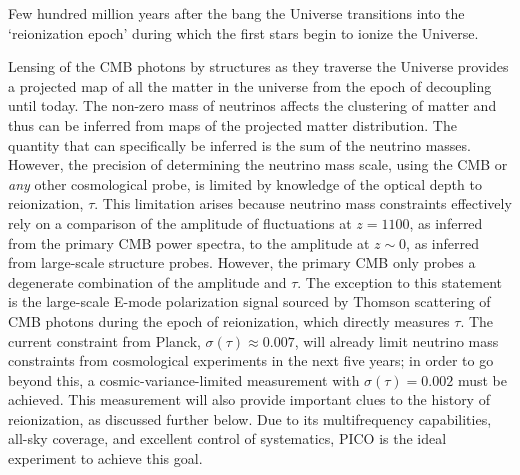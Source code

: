 \documentclass[PICOReport.tex]{subfiles}
\begin{document}
Few hundred million years after the bang the Universe transitions into the `reionization epoch' during which the 
first stars begin to ionize the Universe. 


Lensing of the CMB photons by structures as they traverse the Universe provides a projected map of all the matter 
in the universe from the epoch of decoupling until today.  The non-zero mass of neutrinos affects the clustering of 
matter and thus can be inferred from maps of the projected matter distribution. The quantity that can specifically be 
inferred is the sum of the neutrino masses.  
However, the precision of determining 
the neutrino mass scale, using the CMB or {\it any} other cosmological probe, is limited by knowledge of 
the optical depth to reionization, $\tau$.   
 This limitation arises because neutrino mass constraints effectively 
rely on a comparison of the amplitude of fluctuations at $z=1100$, as inferred from the primary 
CMB power spectra, to the amplitude at $z \sim 0$, as inferred from large-scale structure probes.  
However, the primary CMB only probes a degenerate combination of the amplitude and $\tau$.  
The exception to this statement is the large-scale E-mode polarization signal sourced by Thomson 
scattering of CMB photons during the epoch of reionization, which directly measures $\tau$.  
The current constraint from Planck, $\sigma(\tau) \approx 0.007$, will already limit neutrino mass 
constraints from cosmological experiments in the next five years; in order to go beyond this, a 
cosmic-variance-limited measurement with $\sigma(\tau) = 0.002$ must be achieved. 
This measurement will also provide important clues to the history of reionization, as discussed further below.  
Due to its multifrequency capabilities, all-sky coverage, and excellent control of systematics, 
PICO is the ideal experiment to achieve this goal.
\end{document}
